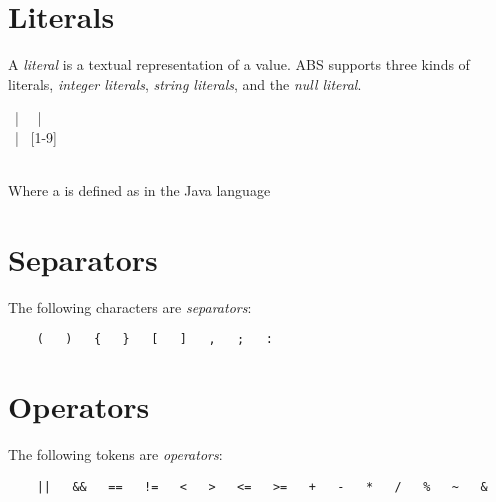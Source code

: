 \section{Literals}
A \emph{literal} is a textual representation of a value.
ABS supports three kinds of literals, \emph{integer literals}, \emph{string literals}, and the \emph{null literal}.

\begin{abssyntax}
        {}
                ~|~ 
                ~|~ 
                \\
     ~|~ [1-9]\MANY{[0-9]}\\
  {}  \\
    {}
\end{abssyntax}

\noindent
Where a  is defined as in the Java language \cite[p.~28]{gosling96}

\section{Separators}
The following characters are \emph{separators}:
\begin{verbatim}
    (   )   {   }   [   ]   ,   ;   :
\end{verbatim}

\section{Operators}
The following tokens are \emph{operators}:
\begin{verbatim}
    ||   &&   ==   !=   <   >   <=   >=   +   -   *   /   %   ~   &   
\end{verbatim}
